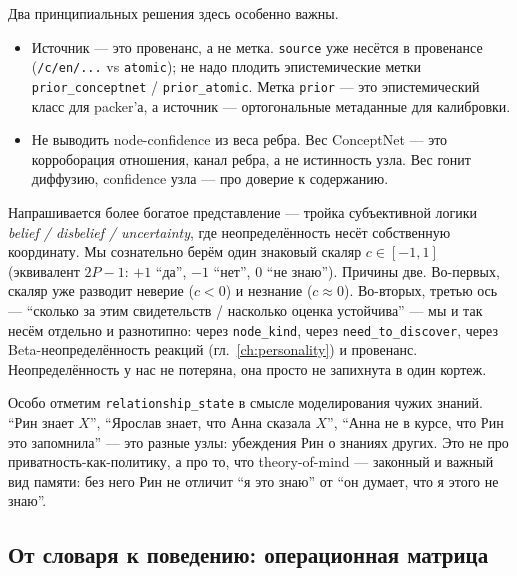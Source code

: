 Два принципиальных решения здесь особенно важны.

\begin{itemize}
\item Источник --- это провенанс, а не метка. \texttt{source} уже несётся в
провенансе (\texttt{/c/en/...} vs \texttt{atomic}); не надо плодить
эпистемические метки \texttt{prior\_conceptnet} / \texttt{prior\_atomic}. Метка
\texttt{prior} --- это эпистемический класс для packer'а, а источник ---
ортогональные метаданные для калибровки.
\item Не выводить node-confidence из веса ребра. Вес ConceptNet --- это
корроборация отношения, канал ребра, а не истинность узла. Вес гонит
диффузию, confidence узла --- про доверие к содержанию.
\end{itemize}

\begin{intuition}
Напрашивается более богатое представление --- тройка субъективной логики
\emph{belief / disbelief / uncertainty}, где неопределённость несёт собственную
координату. Мы сознательно берём один знаковый скаляр $c \in [-1, 1]$
(эквивалент $2P - 1$: $+1$ ``да'', $-1$ ``нет'', $0$ ``не знаю''). Причины
две. Во-первых, скаляр уже разводит неверие ($c < 0$) и незнание
($c \approx 0$). Во-вторых, третью ось --- ``сколько за этим свидетельств /
насколько оценка устойчива'' --- мы и так несём отдельно и разнотипно: через
\texttt{node\_kind}, через \texttt{need\_to\_discover}, через
Beta-неопределённость реакций (гл.~\ref{ch:personality}) и провенанс.
Неопределённость у нас не потеряна, она просто не запихнута в один кортеж.
\end{intuition}

\begin{intuition}
Особо отметим \texttt{relationship\_state} в смысле моделирования чужих
знаний. ``Рин знает $X$'', ``Ярослав знает, что Анна сказала $X$'', ``Анна не в
курсе, что Рин это запомнила'' --- это разные узлы: убеждения Рин о знаниях
других. Это не про приватность-как-политику, а про то, что theory-of-mind ---
законный и важный вид памяти: без него Рин не отличит ``я это знаю'' от ``он
думает, что я этого не знаю''.
\end{intuition}

\subsection{От словаря к поведению: операционная матрица}
\label{sec:kindmatrix}

